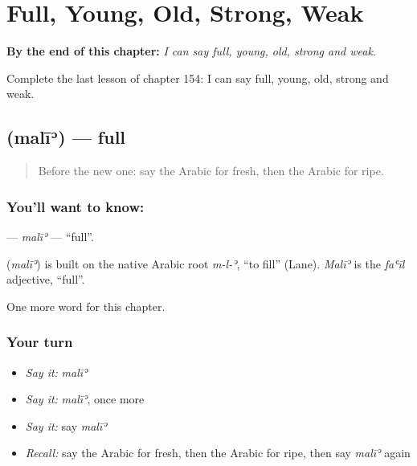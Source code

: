 
\chapter{Full, Young, Old, Strong, Weak}
\label{ch:ar-full-young-old-strong-weak}

\begin{chapteropening}
\textbf{By the end of this chapter:} \emph{I can say full, young, old, strong and weak.}

Complete the last lesson of chapter 154: I can say full, young, old, strong and weak.
\end{chapteropening}

\section[\texorpdfstring{\ar{مليء} (malīʾ)}{مليء (malīʾ)}]{ (malīʾ) — full}

\label{lesson:AR-C154-mali}



\begin{quote}
Before the new one: say the Arabic for fresh, then the Arabic for ripe.
\end{quote}

\subsection*{You'll want to know: }
\textbf{} — \emph{malīʾ} — \textquotedblleft{}full\textquotedblright{}.

\begin{cousinweb}
\textbf{} (\emph{malīʾ}) is built on the native Arabic root \emph{m-l-ʾ}, \textquotedblleft{}to fill\textquotedblright{} (Lane). \emph{Malīʾ} is the \emph{faʿīl} adjective, \textquotedblleft{}full\textquotedblright{}.
\end{cousinweb}

\begin{grammarlens}[title={What you've built}]
One more word for this chapter.
\end{grammarlens}

\subsection*{Your turn}
\begin{itemize}
\raggedright
  \item \emph{Say it:} \emph{malīʾ}
  \item \emph{Say it:} \emph{malīʾ}, once more
  \item \emph{Say it:} say \emph{malīʾ}
  \item \emph{Recall:} say the Arabic for fresh, then the Arabic for ripe, then say \emph{malīʾ} again
\end{itemize}

